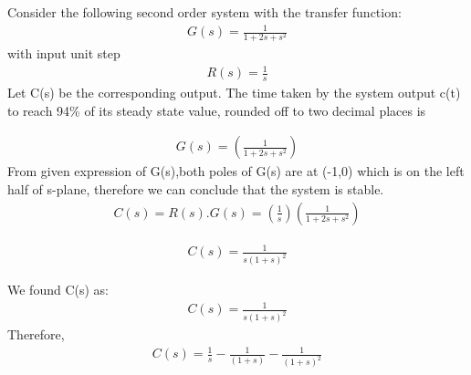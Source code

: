 \item
Consider the following second order system with the transfer function:
\begin{multline}
G(s) = \frac{1}{1+2s+s^2}
\end{multline}
with input unit step 
\begin{multline}
R(s) = \frac{1}{s}
\end{multline}
 Let C(s) be the corresponding output. The time taken by the system output c(t) to reach 94\% of its steady state value, rounded off to two decimal places is

\solution 
\begin{multline}
G(s) = (\frac{1}{1+2s+s^2})
\end{multline}
From given expression of G(s),both poles of G(s) are at (-1,0) which is on the left half of s-plane, therefore we can conclude that the system is stable.
\begin{multline}
C(s) = R(s).G(s) = (\frac{1}{s})  (\frac{1}{1+2s+s^2})
\end{multline}

\begin{multline}
C(s) =  \frac{1}{s(1+s)^2}
\end{multline}

    

We found C(s) as:
\begin{multline}
C(s) =  \frac{1}{s(1+s)^2}
\end{multline}
Therefore,
\begin{multline}
C(s) = \frac{1}{s} - \frac{1}{(1+s)} - \frac{1}{(1+s)^2}
\end{multline}

